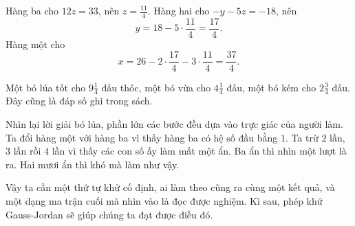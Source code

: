 \documentclass[12pt,a4paper]{article}
\begin{document}
Hàng ba cho \(12z=33\), nên \(z=\frac{11}{4}\). Hàng hai cho \(-y-5z=-18\), nên
$$ y=18-5\cdot\frac{11}{4}=\frac{17}{4}. $$
Hàng một cho
$$ x=26-2\cdot\frac{17}{4}-3\cdot\frac{11}{4}=\frac{37}{4}. $$

Một bó lúa tốt cho \(9\frac14\) đấu thóc, một bó vừa cho \(4\frac14\) đấu, một bó kém cho \(2\frac34\) đấu. Đây cũng là đáp số ghi trong sách.


Nhìn lại lời giải bó lúa, phần lớn các bước đều dựa vào trực giác của người làm. Ta đổi hàng một với hàng ba vì thấy hàng ba có hệ số đầu bằng \(1\). Ta trừ \(2\) lần, \(3\) lần rồi \(4\) lần vì thấy các con số ấy làm mất một ẩn. Ba ẩn thì nhìn một lượt là ra. Hai mươi ẩn thì khó mà làm như vậy. 

Vậy ta cần một thứ tự khử cố định, ai làm theo cũng ra cùng một kết quả, và một dạng ma trận cuối mà nhìn vào là đọc được nghiệm. Kì sau, phép khử Gauss-Jordan sẽ giúp chúng ta đạt được điều đó.
\end{document}
